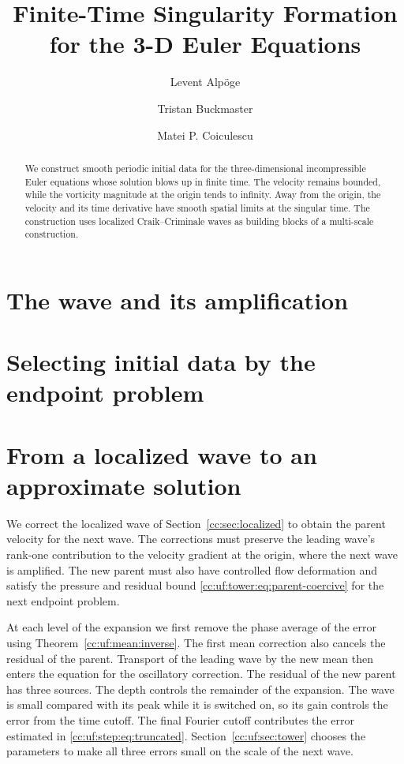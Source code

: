 \documentclass[11pt]{amsart}
\title[Singularity Formation for the 3-D Euler Equations]{Finite-Time Singularity Formation\\for the 3-D Euler Equations}
\author{Levent Alp\"oge}
\author{Tristan Buckmaster}
\author{Matei P. Coiculescu}
\date{}
\numberwithin{equation}{section}
\begin{document}
\raggedbottom
\begin{abstract}
We construct smooth periodic initial data for the three-dimensional
incompressible Euler equations whose solution blows up in finite time.
The velocity remains bounded, while the vorticity magnitude at the origin
tends to infinity. Away from the origin, the velocity and its time derivative
have smooth spatial limits at the singular time. The construction uses
localized Craik--Criminale waves as building blocks of a multi-scale construction.
\end{abstract}
\maketitle
\setcounter{tocdepth}{1}
\tableofcontents




\section{The wave and its amplification}\label{cc:sec:waves}



\section{Selecting initial data by the endpoint problem}\label{cc:sec:endpoint}

\section{From a localized wave to an approximate solution}\label{cc:sec:exact}
We correct the localized wave of Section~\ref{cc:sec:localized} to obtain
the parent velocity for the next wave. The corrections must preserve the
leading wave's rank-one contribution to the velocity gradient at the
origin, where the next wave is amplified. The new parent must also have
controlled flow deformation and satisfy the pressure and residual bound
\eqref{cc:uf:tower:eq:parent-coercive} for the next endpoint problem.

At each level of the expansion we first remove the phase average of the
error using Theorem~\ref{cc:uf:mean:inverse}. The first mean correction
also cancels the residual of the parent. Transport of the leading wave
by the new mean then enters the equation for the oscillatory correction.
The residual of the new parent has three sources. The depth controls the
remainder of the expansion. The wave is small compared with its peak
while it is switched on, so its gain controls the error from the time
cutoff. The final Fourier cutoff contributes the error estimated in
\eqref{cc:uf:step:eq:truncated}. Section~\ref{cc:uf:sec:tower} chooses
the parameters to make all three errors small on the scale of the next
wave.
\end{document}
